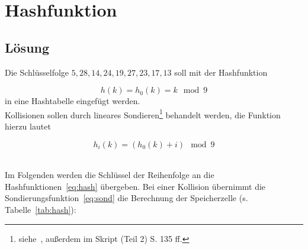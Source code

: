 \chapter{Hashfunktion}

\section*{Lösung}

Die Schlüsselfolge $5, 28, 14, 24, 19, 27, 23, 17, 13$ soll mit der Hashfunktion

\begin{equation}\label{eq:hash}
h(k) = h_0(k) = k\mod 9
\end{equation} in eine Hashtabelle eingefügt werden.
\\

Kollisionen sollen durch lineares Sondieren\footnote{
siehe~\cite[205]{OW17d}, außerdem im Skript (Teil 2) S. 135 ff.
} behandelt werden, die Funktion hierzu lautet

\begin{equation}\label{eq:sond}
    h_i(k) = (h_0(k) + i)\mod 9
\end{equation}

\\

Im Folgenden werden die Schlüssel der Reihenfolge an die Hashfunktionen~\ref{eq:hash} übergeben.
Bei einer Kollision übernimmt die Sondierungsfunktion~\ref{eq:sond} die Berechnung der Speicherzelle (s. Tabelle~\ref{tab:hash}):

